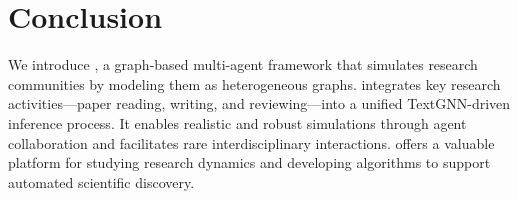 \vspace{-3mm}
\section{Conclusion}

We introduce \envname, a graph-based multi-agent framework that simulates research communities by modeling them as heterogeneous graphs. \envname integrates key research activities—paper reading, writing, and reviewing—into a unified TextGNN-driven inference process. It enables realistic and robust simulations through agent collaboration and facilitates rare interdisciplinary interactions. \envname offers a valuable platform for studying research dynamics and developing algorithms to support automated scientific discovery.
